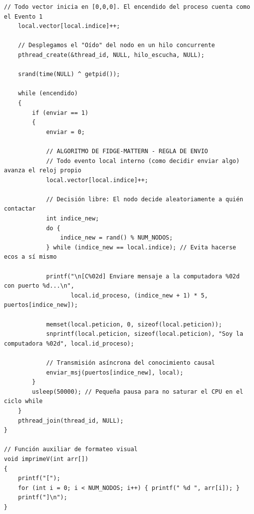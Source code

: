 \begin{lstlisting}[style=estiloC]
    // Todo vector inicia en [0,0,0]. El encendido del proceso cuenta como el Evento 1
    local.vector[local.indice]++;
    
    // Desplegamos el "Oído" del nodo en un hilo concurrente
    pthread_create(&thread_id, NULL, hilo_escucha, NULL);
    
    srand(time(NULL) ^ getpid());

    while (encendido)
    {
        if (enviar == 1)
        {
            enviar = 0;
            
            // ALGORITMO DE FIDGE-MATTERN - REGLA DE ENVIO
            // Todo evento local interno (como decidir enviar algo) avanza el reloj propio
            local.vector[local.indice]++; 

            // Decisión libre: El nodo decide aleatoriamente a quién contactar
            int indice_new;
            do {
                indice_new = rand() % NUM_NODOS;
            } while (indice_new == local.indice); // Evita hacerse ecos a sí mismo
            
            printf("\n[C%02d] Enviare mensaje a la computadora %02d con puerto %d...\n", 
                   local.id_proceso, (indice_new + 1) * 5, puertos[indice_new]);
                   
            memset(local.peticion, 0, sizeof(local.peticion));
            snprintf(local.peticion, sizeof(local.peticion), "Soy la computadora %02d", local.id_proceso);
            
            // Transmisión asíncrona del conocimiento causal
            enviar_msj(puertos[indice_new], local);
        }
        usleep(50000); // Pequeña pausa para no saturar el CPU en el ciclo while
    }
    pthread_join(thread_id, NULL);
}

// Función auxiliar de formateo visual
void imprimeV(int arr[])
{
    printf("[");
    for (int i = 0; i < NUM_NODOS; i++) { printf(" %d ", arr[i]); }
    printf("]\n");
}
\end{lstlisting}

